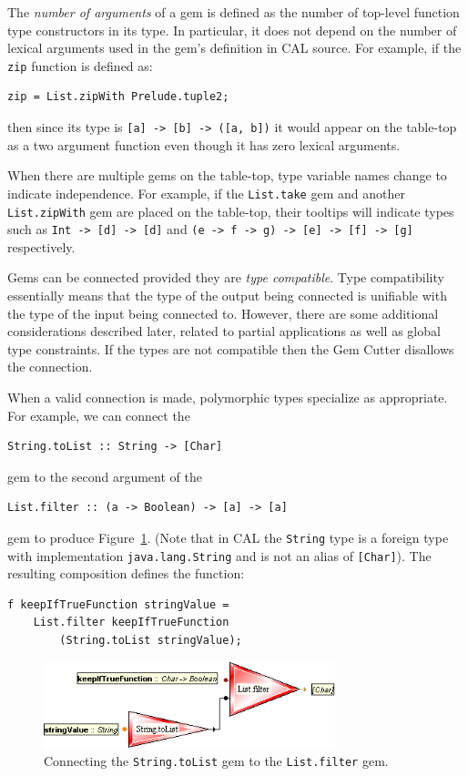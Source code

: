 \documentclass[preprint]{sigplanconf}
\begin{document}
The {\it number of arguments} of a gem is defined as the number of top-level
function type constructors in its type. In particular, it does not
depend on the number of lexical arguments used in the gem's definition
in CAL source. For example, if the {\tt zip} function is defined as:
\begin{verbatim}
zip = List.zipWith Prelude.tuple2;
\end{verbatim}
then since its type is {\tt [a] -> [b] -> ([a, b])} it would appear
on the table-top as a two argument function even though it has zero
lexical arguments.

When there are multiple gems on the table-top, type variable names
change to indicate independence. For example, if the {\tt List.take} gem and
another {\tt List.zipWith} gem are placed on the table-top, their tooltips
will indicate types such as {\tt Int -> [d] -> [d]} and
{\tt (e -> f -> g) -> [e] -> [f] -> [g]} respectively.

Gems can be connected provided they are {\it
type compatible}. Type compatibility essentially means that the type
of the output being connected is unifiable with the type of the input
being connected to. However, there are some additional considerations
described later, related to partial applications as well as global type
constraints. If the types are not compatible then the Gem Cutter
disallows the connection.

When a valid connection is made, polymorphic types specialize as
appropriate.  For example, we can connect the
\begin{verbatim}
String.toList :: String -> [Char]
\end{verbatim}
gem to the second argument of the
\begin{verbatim}
List.filter :: (a -> Boolean) -> [a] -> [a]
\end{verbatim}
gem to produce Figure~\ref{fig:filterStringToList}.
(Note that in CAL the {\tt String} type is a foreign type with implementation
{\tt java.lang.String} and is not an alias of {\tt [Char]}).
The resulting composition defines the function:
\begin{verbatim}
f keepIfTrueFunction stringValue =
    List.filter keepIfTrueFunction
        (String.toList stringValue);
\end{verbatim}

\begin{figure}[htb]
  \centering
  \includegraphics[width=20pc]{filterStringToList.png}
  \caption{Connecting the {\tt String.toList} gem to the {\tt List.filter} gem.}
  \label{fig:filterStringToList}
\end{figure}
\end{document}
